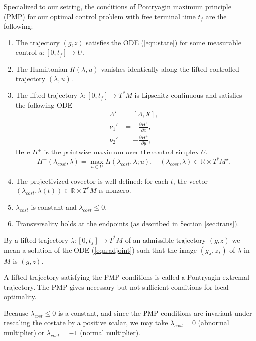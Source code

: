 \documentclass{article}
\theoremstyle{remark}
\newcommand{\ring}[1]{\mathbb{#1}}
\def\Mstar{M^\star}
\newcommand{\partials}[2]{\frac{\partial #1}{\partial #2}}
\begin{document}
Specialized to our setting,
the conditions of Pontryagin maximum principle (PMP) for
our optimal control problem with free terminal time $t_f$ are
the following:
\begin{enumerate}
\item The trajectory $(g,z)$ satisfies the ODE
  (\ref{eqn:state}) for some measurable control $u:[0,t_f]\to U$.
\item The  Hamiltonian $H(\lambda,u)$ vanishes identically along the
  lifted controlled trajectory $(\lambda,u)$.  
\item The lifted trajectory $\lambda:[0,t_f]\to T^*M$ is Lipschitz continuous
  and satisfies the following ODE:
\begin{equation}\label{eqn:adjoint}
\begin{split}
\Lambda' &= [\Lambda,X],\\
\nu_1' &= -\partials{H^+}{x},\\
\nu_2' &= -\partials {H^+}{y},
\end{split}
\end{equation}
Here $H^+$ is the
  pointwise maximum over the control simplex $U$:
\begin{equation}\label{eqn:pmp-max}
H^+(\lambda_{cost},\lambda)=
\max_{u\in U} H(\lambda_{cost},\lambda;u),\quad 
(\lambda_{cost},\lambda)\in\ring{R}\times T^*\Mstar.
\end{equation}
\item The projectivized covector is well-defined: for each $t$, the
  vector $(\lambda_{cost},\lambda(t))\in\ring{R}\times T^*M$ is nonzero.
\item $\lambda_{cost}$ is constant and $\lambda_{cost}\le 0$.
\item Transversality holds at the endpoints (as described in
  Section \ref{sec:trans}).
\end{enumerate}

By a lifted trajectory $\lambda:[0,t_f]\to T^*M$ of an admissible
trajectory $(g,z)$ we mean a solution of the ODE (\ref{eqn:adjoint})
such that the image $(g_\lambda,z_\lambda)$ of $\lambda$ in $M$ is
$(g,z)$.

A lifted trajectory satisfying the PMP conditions is called a
Pontryagin extremal trajectory.  The PMP gives necessary but not
sufficient conditions for local optimality.

Because $\lambda_{cost}\le 0$ is a constant, and since the PMP
conditions are invariant under rescaling the costate by a positive
scalar, we may take $\lambda_{cost}=0$ (abnormal multiplier) or
$\lambda_{cost}=-1$ (normal multiplier).
\end{document}
